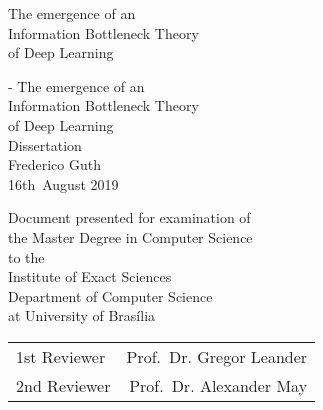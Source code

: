 \thispagestyle{empty}
{
    \begin{fullwidth}
        \centering
        \hphantom{.}
        \vfill
        {
            \Large The emergence of an \\
            \Huge Information Bottleneck Theory\\
            of Deep Learning
        }
        \vfill
        \vfill
    \end{fullwidth}
}

\clearpage{}

\cleardoublepage{}

\thispagestyle{empty}
{
    \calccentering{\unitlength}
    \begin{adjustwidth*}{\unitlength}{-\unitlength}
        \raggedleft{}
        {\Huge\color{Burgundy}%
        The emergence of an\\
        Information Bottleneck Theory\\
        of Deep Learning}\\[\baselineskip]
        {\LARGE%
        Dissertation}\\[0.2\textheight]
        {\huge%
        Frederico Guth}\\[\baselineskip]
        {\LARGE%
        16th~August 2019}
        \vfill
        \vfill
        {\large%
        Document presented for examination of\\
        the Master Degree in Computer Science\\[\baselineskip]%

        to the\\[\baselineskip]

        Institute of Exact Sciences\\
        Department of Computer Science\\
        at University of Brasília\\[2\baselineskip]


        \begin{minipage}{0.5\textwidth}
        \begin{tabular}{lr}
            1st\hspace{4pt} Reviewer & Prof.\ Dr. Gregor Leander\\
            2nd Reviewer & Prof.\ Dr.\; Alexander May
        \end{tabular}
        \end{minipage}
        \hspace*{36pt}

        \vfill
        }
        \vspace*{\baselineskip}
    \end{adjustwidth*}
}

